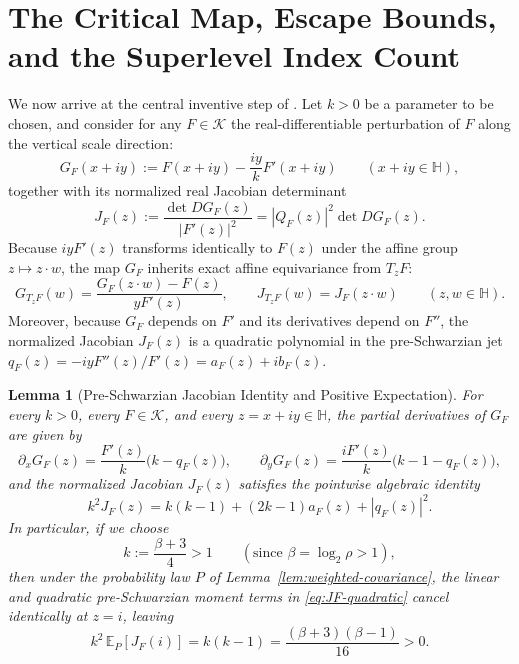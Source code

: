 \documentclass[12pt]{article}
\def\H{\mathbb{H}}
\def\K{\mathcal{K}}
\def\E{\mathbb{E}}
\newtheorem{lemma}[thm]{Lemma}
\theoremstyle{definition}
\numberwithin{equation}{section}
\begin{document}
\section{The Critical Map, Escape Bounds, and the Superlevel Index Count}

We now arrive at the central inventive step of \cite{OAI26}. Let $k > 0$ be a parameter to be chosen, and consider for any $F \in \K$ the real-differentiable perturbation of $F$ along the vertical scale direction:
\begin{equation}\label{eq:GF-def}
  G_F(x + iy) := F(x + iy) - \frac{iy}{k} F'(x + iy) \qquad (x + iy \in \H),
\end{equation}
together with its normalized real Jacobian determinant
\begin{equation}\label{eq:JF-def}
  J_F(z) := \frac{\det DG_F(z)}{|F'(z)|^2} = |Q_F(z)|^2 \det DG_F(z).
\end{equation}
Because $iy F'(z)$ transforms identically to $F(z)$ under the affine group $z \mapsto z \cdot w$, the map $G_F$ inherits exact affine equivariance from $T_z F$:
\begin{equation}\label{eq:GF-equivariance}
  G_{T_z F}(w) = \frac{G_F(z \cdot w) - F(z)}{y F'(z)}, \qquad J_{T_z F}(w) = J_F(z \cdot w) \qquad (z, w \in \H).
\end{equation}
Moreover, because $G_F$ depends on $F'$ and its derivatives depend on $F''$, the normalized Jacobian $J_F(z)$ is a quadratic polynomial in the pre-Schwarzian jet $q_F(z) = -iy F''(z)/F'(z) = a_F(z) + i b_F(z)$.

\begin{lemma}[Pre-Schwarzian Jacobian Identity and Positive Expectation]\label{lem:EJ-pos}
For every $k > 0$, every $F \in \K$, and every $z = x+iy \in \H$, the partial derivatives of $G_F$ are given by
\begin{equation}\label{eq:GF-partials}
  \partial_x G_F(z) = \frac{F'(z)}{k}\big(k - q_F(z)\big), \qquad \partial_y G_F(z) = \frac{i F'(z)}{k}\big(k - 1 - q_F(z)\big),
\end{equation}
and the normalized Jacobian $J_F(z)$ satisfies the pointwise algebraic identity
\begin{equation}\label{eq:JF-quadratic}
  k^2 J_F(z) = k(k - 1) + (2k - 1) a_F(z) + |q_F(z)|^2.
\end{equation}
In particular, if we choose
\begin{equation}\label{eq:k-choice}
  k := \frac{\beta + 3}{4} > 1 \qquad (\text{since } \beta = \log_2 \rho > 1),
\end{equation}
then under the probability law $P$ of Lemma~\ref{lem:weighted-covariance}, the linear and quadratic pre-Schwarzian moment terms in \eqref{eq:JF-quadratic} cancel identically at $z = i$, leaving
\begin{equation}\label{eq:EJ-positive}
  k^2 \, \E_P[J_F(i)] = k(k - 1) = \frac{(\beta + 3)(\beta - 1)}{16} > 0.
\end{equation}
\end{lemma}
\end{document}
